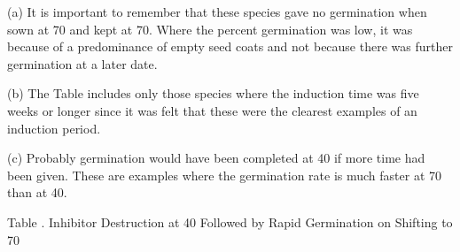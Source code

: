 \begin{table}[h!]
(a) It is important to remember that these species gave no germination when
sown at 70 and kept at 70. Where the percent germination was low, it was because of
a predominance of empty seed coats and not because there was further germination
at a later date.

(b) The Table includes only those species where the induction time was five
weeks or longer since it was felt that these were the clearest examples of an induction
period.

(c) Probably germination would have been completed at 40 if more time had
been given. These are examples where the germination rate is much faster at 70 than
at 40.

\end{table}

\begin{table}[h!]
\begin{center}
Table \thetable. Inhibitor Destruction at 40 Followed by Rapid Germination on Shifting to 70
\end{center}
\par


\end{table}
